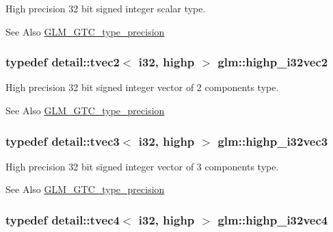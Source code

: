 High precision 32 bit signed integer scalar type. \begin{DoxySeeAlso}{See Also}
\hyperlink{group__gtc__type__precision}{G\-L\-M\-\_\-\-G\-T\-C\-\_\-type\-\_\-precision} 
\end{DoxySeeAlso}
\hypertarget{group__gtc__type__precision_ga6020d795076243085eb0d6826c849b4a}{
\subsubsection[{highp\-\_\-i32vec2}]{\setlength{\rightskip}{0pt plus 5cm}typedef detail\-::tvec2$<$ i32, highp $>$ {\bf glm\-::highp\-\_\-i32vec2}}}\label{group__gtc__type__precision_ga6020d795076243085eb0d6826c849b4a}
High precision 32 bit signed integer vector of 2 components type. \begin{DoxySeeAlso}{See Also}
\hyperlink{group__gtc__type__precision}{G\-L\-M\-\_\-\-G\-T\-C\-\_\-type\-\_\-precision} 
\end{DoxySeeAlso}
\hypertarget{group__gtc__type__precision_ga95de80f73e676fb6b9976ff0d33bbc4b}{
\subsubsection[{highp\-\_\-i32vec3}]{\setlength{\rightskip}{0pt plus 5cm}typedef detail\-::tvec3$<$ i32, highp $>$ {\bf glm\-::highp\-\_\-i32vec3}}}\label{group__gtc__type__precision_ga95de80f73e676fb6b9976ff0d33bbc4b}
High precision 32 bit signed integer vector of 3 components type. \begin{DoxySeeAlso}{See Also}
\hyperlink{group__gtc__type__precision}{G\-L\-M\-\_\-\-G\-T\-C\-\_\-type\-\_\-precision} 
\end{DoxySeeAlso}
\hypertarget{group__gtc__type__precision_ga174af0fafdc5a9eb24150792bffa8b5c}{
\subsubsection[{highp\-\_\-i32vec4}]{\setlength{\rightskip}{0pt plus 5cm}typedef detail\-::tvec4$<$ i32, highp $>$ {\bf glm\-::highp\-\_\-i32vec4}}}\label{group__gtc__type__precision_ga174af0fafdc5a9eb24150792bffa8b5c}
